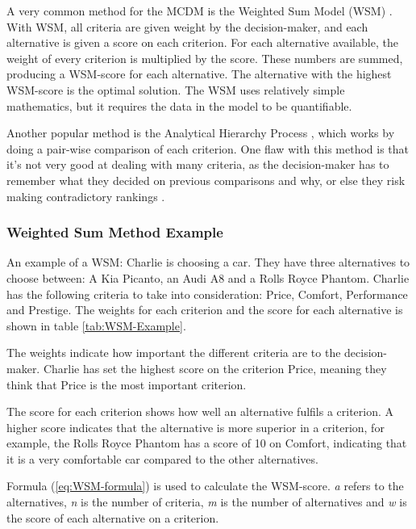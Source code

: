  A very common method for the MCDM is the Weighted Sum Model (WSM)  \cite[p.~6]{TriantaphyllouEvangelos2000MDMM}. With WSM, all criteria are given weight by the decision-maker, and each alternative is given a score on each criterion. For each alternative available, the weight of every criterion is multiplied by the score. These numbers are summed, producing a WSM-score for each alternative. The alternative with the highest WSM-score is the optimal solution. The WSM uses relatively simple mathematics, but it requires the data in the model to be quantifiable.  
 
Another popular method is the Analytical Hierarchy Process \cite{Vargas2010}, which works by doing a pair-wise comparison of each criterion. One flaw with this method is that it’s not very good at dealing with many criteria, as the decision-maker has to remember what they decided on previous comparisons and why, or else they risk making contradictory rankings  \cite[p.~11]{TriantaphyllouEvangelos2000MDMM}.

\subsubsection{Weighted Sum Method Example}

An example of a WSM: Charlie is choosing a car. They have three alternatives to choose between: A Kia Picanto, an Audi A8 and a Rolls Royce Phantom. 
Charlie has the following criteria to take into consideration: Price, Comfort, Performance and Prestige. The weights for each criterion and the score for each alternative is shown in table \ref{tab:WSM-Example}.



The weights indicate how important the different criteria are to the decision-maker. Charlie has set the highest score on the criterion Price, meaning they think that Price is the most important criterion.

The score for each criterion shows how well an alternative fulfils a criterion. A higher score indicates that the alternative is more superior in a criterion, for example, the Rolls Royce Phantom has a score of 10 on Comfort, indicating that it is a very comfortable car compared to the other alternatives.

Formula (\ref{eq:WSM-formula}) is used to calculate the WSM-score. \textit{a} refers to the alternatives, \textit{n} is the number of criteria, \textit{m} is the number of alternatives and \textit{w} is the score of each alternative on a criterion.

